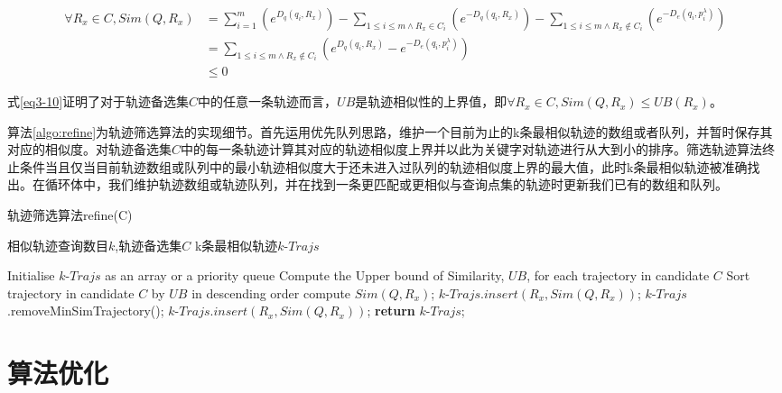 \begin{equation} 
\label{eq3-10}
\begin{split}
\forall R_{x}\in C, Sim(Q, R_{x})  & = \sum_{i=1}^{m}(e^{D_{q}(q_{i}, R_{x})})-\sum_{1\leq i\leq m\wedge R_{x}\in C_{i}}(e^{-D_{q}(q_{i}, R_{x})}) -\sum_{1\leq i\leq m\wedge R_{x}\notin C_{i}}(e^{-D_{e}(q_{i}, p_{i}^{\lambda})})\\
 & = \sum_{1\leq i\leq m\wedge R_{x}\notin C_{i}}(e^{D_{q}(q_{i}, R_{x})}-e^{-D_{e}(q_{i}, p_{i}^{\lambda})})\\
 & \leq 0
\end{split}
\end{equation}

式\ref{eq3-10}证明了对于轨迹备选集$C$中的任意一条轨迹而言，$UB$是轨迹相似性的上界值，即$\forall R_{x}\in C, Sim(Q,R_{x}) \leq UB(R_{x})$。

算法\ref{algo:refine}为轨迹筛选算法的实现细节。首先运用优先队列思路，维护一个目前为止的k条最相似轨迹的数组或者队列，并暂时保存其对应的相似度。对轨迹备选集$C$中的每一条轨迹计算其对应的轨迹相似度上界并以此为关键字对轨迹进行从大到小的排序。筛选轨迹算法终止条件当且仅当目前轨迹数组或队列中的最小轨迹相似度大于还未进入过队列的轨迹相似度上界的最大值，此时k条最相似轨迹被准确找出。在循环体中，我们维护轨迹数组或轨迹队列，并在找到一条更匹配或更相似与查询点集的轨迹时更新我们已有的数组和队列。

\begin{algorithm}
\caption{轨迹筛选算法refine(C)}
\label{algo:refine}
\begin{algorithmic}[1] %
\Require 相似轨迹查询数目$k$,轨迹备选集$C$
\Ensure k条最相似轨迹$k$-$Trajs$ %

\State Initialise $k$-$Trajs$ as an array or a priority queue
\State Compute the Upper bound of Similarity, $UB$, for each trajectory in candidate $C$
\State Sort trajectory in candidate $C$ by $UB$ in descending order
	\State compute $Sim(Q,R_{x})$;
		\State $k$-$Trajs$.$insert(R_{x},Sim(Q,R_{x}))$;
	\Else 
			\State $k$-$Trajs$.removeMinSimTrajectory();
			\State $k$-$Trajs$.$insert(R_{x},Sim(Q,R_{x}))$;
		\EndIf
			\State \textbf{return} $k$-$Trajs$;
		\EndIf
	\EndIf
\EndFor
\end{algorithmic}
\end{algorithm}


\section{算法优化}
\label{sec:optimization}


